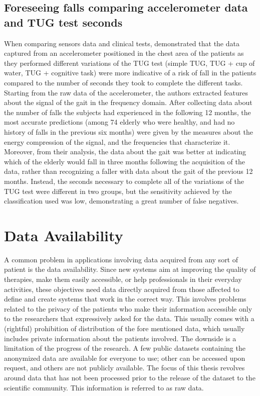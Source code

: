 \subsection{Foreseeing falls comparing accelerometer data and TUG test seconds}
When comparing sensors data and clinical tests, \cite{ForesseingACCTUG} demonstrated that the data captured from an accelerometer positioned in the chest area of the patients as they performed different variations of the TUG test (simple TUG, TUG + cup of water, TUG + cognitive task) were more indicative of a risk of fall in the patients compared to the number of seconds they took to complete the different tasks.
Starting from the raw data of the accelerometer, the authors extracted features about the signal of the gait in the frequency domain.
After collecting data about the number of falls the subjects had experienced in the following 12 months, the most accurate predictions (among 74 elderly who were healthy, and had no history of falls in the previous six months) were given by the measures about the energy compression of the signal, and the frequencies that characterize it. 
Moreover, from their analysis, the data about the gait was better at indicating which of the elderly would fall in three months following the acquisition of the data, rather than recognizing a faller with data about the gait of the previous 12 months. 
Instead, the seconds necessary to complete all of the variations of the TUG test were different in two groups, but the sensitivity achieved by the classification used was low, demonstrating a great number of false negatives.


\section{Data Availability}
A common problem in applications involving data acquired from any sort of patient is the data availability. Since new systems aim at improving the quality of therapies, make them easily accessible, or help professionals in their everyday activities, these objectives need data directly acquired from those affected to define and create systems that work in the correct way. This involves problems related to the privacy of the patients who make their information accessible only to the researchers that expressively asked for the data. This usually comes with a (rightful) prohibition of distribution of the fore mentioned data, which usually includes private information about the patients involved. The downside is a limitation of the progress of the research. 
A few public datasets containing the anonymized data are available for everyone to use; other can be accessed upon request, and others are not publicly available. The focus of this thesis revolves around data that has not been processed prior to the release of the dataset to the scientific community. This information is referred to as raw data.


